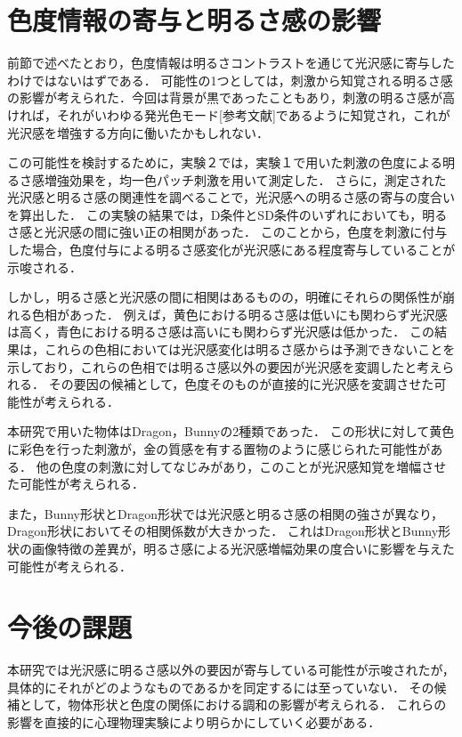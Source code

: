     \section{色度情報の寄与と明るさ感の影響}
        前節で述べたとおり，色度情報は明るさコントラストを通じて光沢感に寄与したわけではないはずである．
        可能性の1つとしては，刺激から知覚される明るさ感の影響が考えられた．今回は背景が黒であったこともあり，刺激の明るさ感が高ければ，それがいわゆる発光色モード[参考文献]であるように知覚され，これが光沢感を増強する方向に働いたかもしれない．
        
        この可能性を検討するために，実験２では，実験１で用いた刺激の色度による明るさ感増強効果を，均一色パッチ刺激を用いて測定した．
        さらに，測定された光沢感と明るさ感の関連性を調べることで，光沢感への明るさ感の寄与の度合いを算出した．
        この実験の結果では，D条件とSD条件のいずれにおいても，明るさ感と光沢感の間に強い正の相関があった．
        このことから，色度を刺激に付与した場合，色度付与による明るさ感変化が光沢感にある程度寄与していることが示唆される．

        しかし，明るさ感と光沢感の間に相関はあるものの，明確にそれらの関係性が崩れる色相があった．
        例えば，黄色における明るさ感は低いにも関わらず光沢感は高く，青色における明るさ感は高いにも関わらず光沢感は低かった．
        この結果は，これらの色相においては光沢感変化は明るさ感からは予測できないことを示しており，これらの色相では明るさ感以外の要因が光沢感を変調したと考えられる．
        その要因の候補として，色度そのものが直接的に光沢感を変調させた可能性が考えられる．
        
        本研究で用いた物体はDragon，Bunnyの2種類であった．
        この形状に対して黄色に彩色を行った刺激が，金の質感を有する置物のように感じられた可能性がある．
        他の色度の刺激に対してなじみがあり，このことが光沢感知覚を増幅させた可能性が考えられる．
        
        また，Bunny形状とDragon形状では光沢感と明るさ感の相関の強さが異なり，Dragon形状においてその相関係数が大きかった．
        これはDragon形状とBunny形状の画像特徴の差異が，明るさ感による光沢感増幅効果の度合いに影響を与えた可能性が考えられる．

    \section{今後の課題}
        本研究では光沢感に明るさ感以外の要因が寄与している可能性が示唆されたが，具体的にそれがどのようなものであるかを同定するには至っていない．
        その候補として，物体形状と色度の関係における調和の影響が考えられる．
        これらの影響を直接的に心理物理実験により明らかにしていく必要がある．

